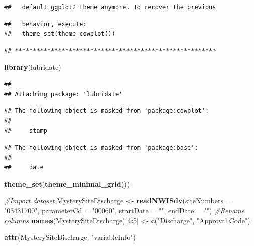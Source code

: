 \documentclass[]{article}
\newenvironment{Shaded}{\begin{snugshade}}{\end{snugshade}}
\newcommand{\CommentTok}[1]{\textcolor[rgb]{0.56,0.35,0.01}{\textit{#1}}}
\newcommand{\DataTypeTok}[1]{\textcolor[rgb]{0.13,0.29,0.53}{#1}}
\newcommand{\DecValTok}[1]{\textcolor[rgb]{0.00,0.00,0.81}{#1}}
\newcommand{\KeywordTok}[1]{\textcolor[rgb]{0.13,0.29,0.53}{\textbf{#1}}}
\newcommand{\NormalTok}[1]{#1}
\newcommand{\OperatorTok}[1]{\textcolor[rgb]{0.81,0.36,0.00}{\textbf{#1}}}
\newcommand{\StringTok}[1]{\textcolor[rgb]{0.31,0.60,0.02}{#1}}
\begin{document}
\begin{verbatim}
##   default ggplot2 theme anymore. To recover the previous
\end{verbatim}

\begin{verbatim}
##   behavior, execute:
##   theme_set(theme_cowplot())
\end{verbatim}

\begin{verbatim}
## ********************************************************
\end{verbatim}

\begin{Shaded}
\begin{Highlighting}[]
\KeywordTok{library}\NormalTok{(lubridate)}
\end{Highlighting}
\end{Shaded}

\begin{verbatim}
## 
## Attaching package: 'lubridate'
\end{verbatim}

\begin{verbatim}
## The following object is masked from 'package:cowplot':
## 
##     stamp
\end{verbatim}

\begin{verbatim}
## The following object is masked from 'package:base':
## 
##     date
\end{verbatim}

\begin{Shaded}
\begin{Highlighting}[]
\KeywordTok{theme_set}\NormalTok{(}\KeywordTok{theme_minimal_grid}\NormalTok{())}

\CommentTok{#Import dataset}
\NormalTok{MysterySiteDischarge <-}\StringTok{ }\KeywordTok{readNWISdv}\NormalTok{(}\DataTypeTok{siteNumbers =} \StringTok{"03431700"}\NormalTok{,}
                                  \DataTypeTok{parameterCd =} \StringTok{"00060"}\NormalTok{,}
                                  \DataTypeTok{startDate =} \StringTok{""}\NormalTok{,}
                                  \DataTypeTok{endDate =} \StringTok{""}\NormalTok{)}
\CommentTok{#Rename columns  }
\KeywordTok{names}\NormalTok{(MysterySiteDischarge)[}\DecValTok{4}\OperatorTok{:}\DecValTok{5}\NormalTok{] <-}\StringTok{ }\KeywordTok{c}\NormalTok{(}\StringTok{"Discharge"}\NormalTok{, }\StringTok{"Approval.Code"}\NormalTok{)}

\KeywordTok{attr}\NormalTok{(MysterySiteDischarge, }\StringTok{"variableInfo"}\NormalTok{)}
\end{Highlighting}
\end{Shaded}
\end{document}
